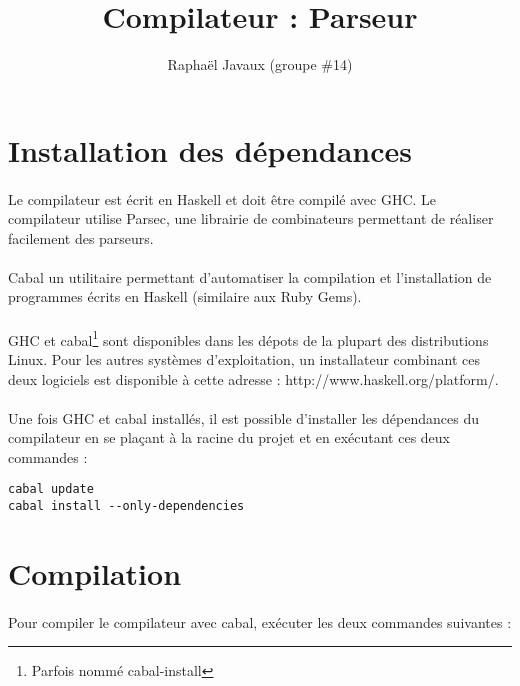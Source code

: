 \documentclass[a4paper]{article}
\title{Compilateur : Parseur}
\author{Raphaël Javaux (groupe \#14)}
\date{}
\begin{document}
\maketitle

  \section{Installation des dépendances}

    \paragraph{}Le compilateur est écrit en Haskell et doit être compilé avec
GHC. Le compilateur utilise Parsec, une librairie de combinateurs permettant de
réaliser facilement des parseurs.

    \paragraph{}Cabal un utilitaire permettant d'automatiser la compilation
et l'installation de programmes écrits en Haskell (similaire aux Ruby Gems).

    \paragraph{}GHC et cabal\footnote{Parfois nommé cabal-install} sont 
disponibles dans les dépots de la plupart des distributions Linux. Pour les
autres systèmes d'exploitation, un installateur combinant ces deux logiciels est
disponible à cette adresse : http://www.haskell.org/platform/.

    \paragraph{}Une fois GHC et cabal installés, il est possible d'installer les
dépendances du compilateur en se plaçant à la racine du projet et en exécutant
ces deux commandes :

\begin{lstlisting}
cabal update
cabal install --only-dependencies
\end{lstlisting}

  \section{Compilation}

    \paragraph{}Pour compiler le compilateur avec cabal, exécuter les deux
commandes suivantes :
\end{document}
